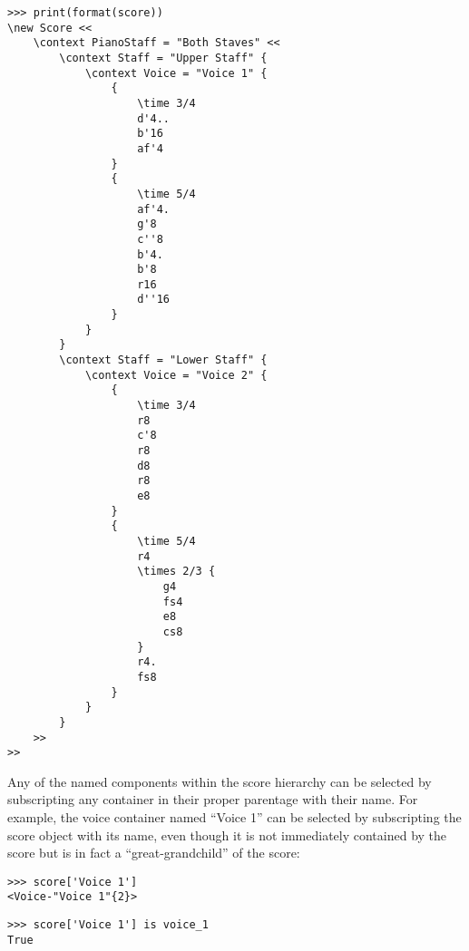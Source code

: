 \begin{abjadbookoutput}
\begin{singlespacing}
\vspace{-0.5\baselineskip}
\begin{lstlisting}
>>> print(format(score))
\new Score <<
    \context PianoStaff = "Both Staves" <<
        \context Staff = "Upper Staff" {
            \context Voice = "Voice 1" {
                {
                    \time 3/4
                    d'4..
                    b'16
                    af'4
                }
                {
                    \time 5/4
                    af'4.
                    g'8
                    c''8
                    b'4.
                    b'8
                    r16
                    d''16
                }
            }
        }
        \context Staff = "Lower Staff" {
            \context Voice = "Voice 2" {
                {
                    \time 3/4
                    r8
                    c'8
                    r8
                    d8
                    r8
                    e8
                }
                {
                    \time 5/4
                    r4
                    \times 2/3 {
                        g4
                        fs4
                        e8
                        cs8
                    }
                    r4.
                    fs8
                }
            }
        }
    >>
>>
\end{lstlisting}
\end{singlespacing}
\end{abjadbookoutput}

\noindent Any of the named components within the score hierarchy can be
selected by subscripting any container in their proper parentage with their
name. For example, the voice container named \enquote{Voice 1} can be selected
by subscripting the score object with its name, even though it is not
immediately contained by the score but is in fact a \enquote{great-grandchild}
of the score:

\begin{comment}
<abjad>
score['Voice 1']
score['Voice 1'] is voice_1
</abjad>
\end{comment}

\begin{abjadbookoutput}
\begin{singlespacing}
\vspace{-0.5\baselineskip}
\begin{lstlisting}
>>> score['Voice 1']
<Voice-"Voice 1"{2}>
\end{lstlisting}
\begin{lstlisting}
>>> score['Voice 1'] is voice_1
True
\end{lstlisting}
\end{singlespacing}
\end{abjadbookoutput}

